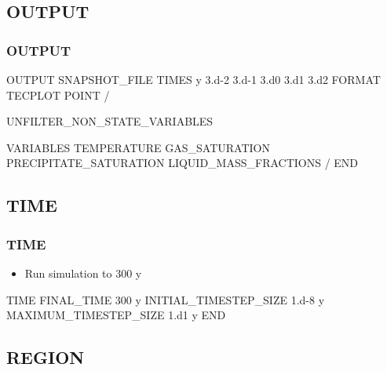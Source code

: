 \documentclass{beamer}
\begin{document}
\subsection{OUTPUT}

\begin{frame}[fragile]\frametitle{OUTPUT}

\begin{semiverbatim}
OUTPUT
  SNAPSHOT_FILE
    TIMES y 3.d-2 3.d-1 3.d0 3.d1 3.d2
    FORMAT TECPLOT POINT
  /

  UNFILTER_NON_STATE_VARIABLES

  VARIABLES
   TEMPERATURE
   GAS_SATURATION
   PRECIPITATE_SATURATION
   LIQUID_MASS_FRACTIONS
  /
END
\end{semiverbatim}

\end{frame}

\subsection{TIME}

\begin{frame}[fragile]\frametitle{TIME}

\begin{itemize}
\item Run simulation to 300 y
\end{itemize}

\begin{semiverbatim}

TIME
  FINAL_TIME 300 y
  INITIAL_TIMESTEP_SIZE 1.d-8 y
  MAXIMUM_TIMESTEP_SIZE 1.d1 y
END

\end{semiverbatim}

\end{frame}

\subsection{REGION}
\end{document}
